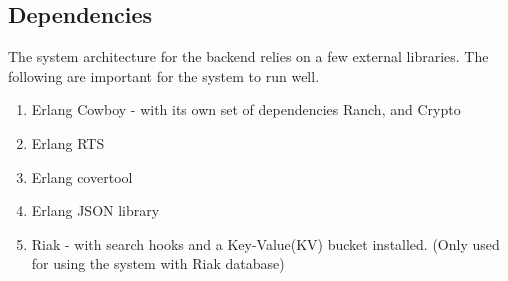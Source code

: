 \newpage
\subsection {Dependencies}

The system architecture for the backend relies on a few external libraries. The following are important for the system to run well. 

\begin {enumerate}
\item Erlang Cowboy - with its own set of dependencies Ranch, and Crypto
\item Erlang RTS 
\item Erlang covertool
\item Erlang JSON library
\item Riak - with search hooks and a Key-Value(KV) bucket installed.
		(Only used for using the system with Riak database)
\end {enumerate}
